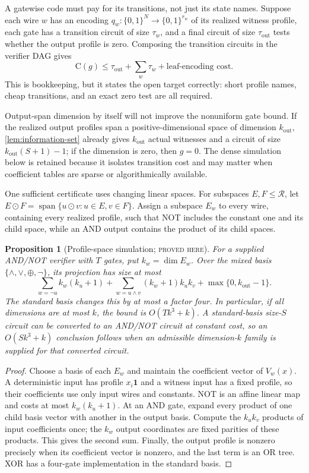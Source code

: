 \documentclass[11pt]{article}
\newtheorem{proposition}[proposition]{Proposition}
\theoremstyle{definition}
\theoremstyle{remark}
\newcommand{\bits}{\{0,1\}}
\newcommand{\C}{\mathrm C}
\newcommand{\Span}{\operatorname{span}}
\newcommand{\had}{\mathbin{\odot}}
\newcommand{\status}[1]{\textsc{#1}}
\begin{document}
A gatewise code must pay for its transitions, not just its state names.
Suppose each wire $w$ has an encoding
$q_w:\bits^N\to\bits^{r_w}$ of its realized witness profile, each gate has a
transition circuit of size $\tau_w$, and a final circuit of size
$\tau_{\mathrm{out}}$ tests whether the output profile is zero.  Composing
the transition circuits in the verifier DAG gives
\[
  \C(g)\le \tau_{\mathrm{out}}+\sum_w\tau_w
  +\text{leaf-encoding cost}.
  \tag{6.1}\label{eq:profile-system}
\]
This is bookkeeping, but it states the open target correctly: short profile
names, cheap transitions, and an exact zero test are all required.

Output-span dimension by itself will not improve the nonuniform gate bound.
If the realized output profiles span a positive-dimensional space of dimension
$k_{\mathrm{out}}$, \cref{lem:information-set} already gives
$k_{\mathrm{out}}$ actual witnesses and a circuit of size
$k_{\mathrm{out}}(S+1)-1$; if the dimension is zero, then $g=0$.  The dense
simulation below is retained because it isolates transition cost and may
matter when coefficient tables are sparse or algorithmically available.

One sufficient certificate uses changing linear spaces.  For subspaces
$E,F\le\mathcal R$, let
$E\had F=\Span\{u\had v:u\in E,v\in F\}$.  Assign a subspace $E_w$ to every
wire, containing every realized profile, such that NOT includes the constant
one and its child space, while an AND output contains the product of its child
spaces.

\begin{proposition}[Profile-space simulation; \status{proved here}]
\label{prop:profile-space}
For a supplied AND/NOT verifier with $T$ gates, put $k_w=\dim E_w$.  Over the
mixed basis $\{\wedge,\vee,\oplus,\neg\}$, its projection has size at most
\[
  \sum_{w=\neg u} k_w(k_u+1)
  +\sum_{w=u\wedge v}(k_w+1)k_uk_v
  +\max\{0,k_{\mathrm{out}}-1\}.
  \tag{6.2}\label{eq:profile-space-bound}
\]
The standard basis changes this by at most a factor four.  In particular,
if all dimensions are at most $k$, the bound is $O(Tk^3+k)$.  A standard-basis
size-$S$ circuit can be converted to an AND/NOT circuit at constant cost, so an
$O(Sk^3+k)$ conclusion follows when an admissible dimension-$k$ family is
supplied for that converted circuit.
\end{proposition}

\begin{proof}
Choose a basis of each $E_w$ and maintain the coefficient vector of
$V_w(x)$.  A deterministic input has profile $x_i\mathbf1$ and a witness
input has a fixed profile, so their coefficients use only input wires and
constants.  NOT is an affine linear map and costs at most $k_w(k_u+1)$.
At an AND gate, expand every product of one child basis vector with another in
the output basis.  Compute the $k_uk_v$ products of input coefficients once;
the $k_w$ output coordinates are fixed parities of these products.  This gives
the second sum.  Finally, the output profile is nonzero precisely when its
coefficient vector is nonzero, and the last term is an OR tree.  XOR has a
four-gate implementation in the standard basis.
\end{proof}
\end{document}
